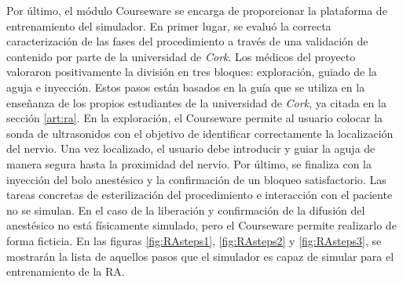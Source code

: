 Por último, el módulo \ac{Courseware} se encarga de proporcionar la plataforma de entrenamiento del simulador.
En primer lugar, se evaluó la correcta caracterización de las fases del procedimiento a través de una validación de contenido por parte de la universidad de \emph{Cork}. Los médicos del proyecto valoraron positivamente la división en tres bloques: exploración, guiado de la aguja e inyección. Estos pasos están basados en la guía que se utiliza en la enseñanza de los propios estudiantes de la universidad de \emph{Cork}, ya citada en la sección \ref{art:ra}. En la exploración, el \ac{Courseware} permite al usuario colocar la sonda de ultrasonidos con el objetivo de identificar correctamente la localización del nervio. Una vez localizado, el usuario debe introducir y guiar la aguja de manera segura hasta la proximidad del nervio. Por último, se finaliza con la inyección del bolo anestésico y la confirmación de un bloqueo satisfactorio. Las tareas concretas de esterilización del procedimiento e interacción con el paciente no se simulan. En el caso de la liberación y  confirmación de la difusión del anestésico no está físicamente simulado, pero el \ac{Courseware} permite realizarlo de forma ficticia. En las figuras \ref{fig:RAsteps1}, \ref{fig:RAsteps2} y \ref{fig:RAsteps3}, se mostrarán la lista de aquellos pasos que el simulador es capaz de simular para el entrenamiento de la \ac{RA}.


